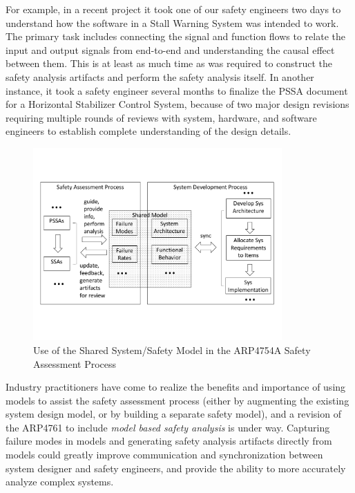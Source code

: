 For example, in a recent project it took one of our safety engineers two days to understand how the software in a Stall Warning System was intended to work. The primary task includes connecting the signal and function flows to relate the input and output signals from end-to-end and understanding the causal effect between them. This is at least as much time as was required to construct the safety analysis artifacts and perform the safety analysis itself. In another instance, it took a safety engineer several months to finalize the PSSA document for a Horizontal Stabilizer Control System, because of two major design revisions requiring multiple rounds of reviews with system, hardware, and software engineers to establish complete understanding of the design %
details.

\begin{figure}[t!]
	\vspace{-0.45in}
	\centering
	\includegraphics[trim=0 9 0 5,clip,width=0.85\textwidth]{images/safety_process.pdf}
	\vspace{-0.45in}
	\caption{Use of the Shared System/Safety Model in the ARP4754A Safety Assessment Process}
	\label{fig:proposed_safety_process}
\end{figure}

Industry practitioners have come to realize the benefits and importance of
using models to assist the safety assessment process (either by augmenting the existing system design model, or by building a separate safety model), and a revision of the ARP4761 to include {\em model based safety analysis} is under way.
Capturing failure modes in models and generating safety analysis artifacts directly from models could greatly improve communication and synchronization between system designer and safety engineers, and provide the ability to more accurately analyze complex systems. 

